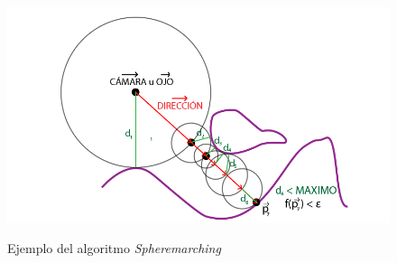  \begin{figure}[H]
  \centering
  \captionsetup{justification=centering}%
  \includegraphics[width=1.0\textwidth]{secciones/imagenes/starting/spheremarching.png}\label{fig:spheremarcher}
  \caption{Ejemplo del algoritmo \textit{Spheremarching}}
\end{figure}

